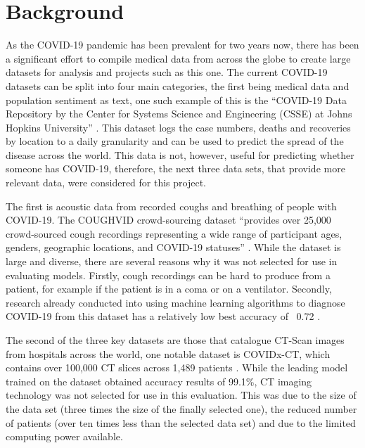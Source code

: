 \section{Background}
As the COVID-19 pandemic has been prevalent for two years now, there has been a significant effort to compile medical data from across the globe to create large datasets for analysis and projects such as this one. The current COVID-19 datasets can be split into four main categories, the first being medical data and population sentiment as text, one such example of this is the “COVID-19 Data Repository by the Center for Systems Science and Engineering (CSSE) at Johns Hopkins University” \citep{dong2020interactive}. This dataset logs the case numbers, deaths and recoveries by location to a daily granularity and can be used to predict the spread of the disease across the world. This data is not, however, useful for predicting whether someone has COVID-19, therefore, the next three data sets, that provide more relevant data, were considered for this project.

The first is acoustic data from recorded coughs and breathing of people with COVID-19. The COUGHVID crowd-sourcing dataset “provides over 25,000 crowd-sourced cough recordings representing a wide range of participant ages, genders, geographic locations, and COVID-19 statuses” \citep[pg. 1]{orlandic2021coughvid}. While the dataset is large and diverse, there are several reasons why it was not selected for use in evaluating models. Firstly, cough recordings can be hard to produce from a patient, for example if the patient is in a coma or on a ventilator. Secondly, research already conducted into using machine learning algorithms to diagnose COVID-19 from this dataset has a relatively low best accuracy of ~0.72 \citep{chang2021covnet}. 

The second of the three key datasets are those that catalogue CT-Scan images from hospitals across the world, one notable dataset is COVIDx-CT, which contains over 100,000 CT slices across 1,489 patients \citep{gunraj2020covidnet}. While the leading model trained on the dataset obtained accuracy results of 99.1\%, CT imaging technology was not selected for use in this evaluation. This was due to the size of the data set (three times the size of the finally selected one), the reduced number of patients (over ten times less than the selected data set) and due to the limited computing power available.

